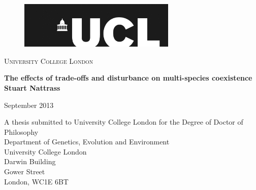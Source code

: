 

\begin{figure}[htbp]
\begin{center}
\includegraphics[width=7.5cm]{ucllogo.pdf}
\end{center}
\end{figure}

\begin{center}
\begin{huge}\textsc{University College London}\end{huge}
\end{center}
\vspace{2cm}
\hline
\vfill
\begin{center}
{ \huge \textbf{The effects of trade-offs and disturbance on multi-species coexistence} }\\[1cm]
\vfill
\vfill
\large\textbf{Stuart Nattrass}
\end{center}

\begin{center}
\vfill
September 2013\\
\end{center}

\vfill
\begin{center}
A thesis submitted to University College London for the Degree of Doctor of Philosophy\\
\vfill
Department of Genetics, Evolution and Environment\\
University College London\\
Darwin Building\\
Gower Street\\
London, WC1E 6BT\\
\end{center}


